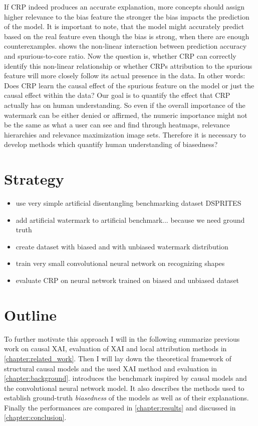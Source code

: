 If CRP indeed produces an accurate explanation, more concepts should assign higher relevance to the bias feature the stronger the bias impacts the prediction of the model. It is important to note, that the model might accurately predict based on the real feature even though the bias is strong, when there are enough counterexamples.  shows the non-linear interaction between prediction accuracy and spurious-to-core ratio.
Now the question is, whether CRP can correctly identify this non-linear relationship or whether CRPs attribution to the spurious feature will more closely follow its actual presence in the data. 
In other words: Does CRP learn the causal effect of the spurious feature on the model or just the causal effect within the data? Our goal is to quantify the effect that CRP actually has on human understanding. So even if the overall importance of the watermark can be either denied or affirmed, the numeric importance might not be the same as what a user can see and find through heatmaps, relevance hierarchies and relevance maximization image sets. Therefore it is necessary to develop methods which quantify human understanding of biasedness?  

\section{Strategy}
\begin{itemize}
    \item use very simple artificial disentangling benchmarking dataset DSPRITES
    \item add artificial watermark to artificial benchmark... because we need ground truth
    \item create dataset with biased and with unbiased watermark distribution
    \item train very small convolutional neural network on recognizing shapes
    \item evaluate CRP on neural network trained on biased and unbiased dataset
\end{itemize}

\section{Outline}
To further motivate this approach I will in the following summarize previous work on causal XAI, evaluation of XAI and local attribution methods in \cref{chapter:related_work}. Then I will lay down the theoretical framework of structural causal models and the used XAI method and evaluation in \cref{chapter:background}.  introduces the benchmark inspired by causal models and the convolutional neural network model. It also describes the methods used to establish ground-truth \textit{biasedness} of the models as well as of their explanations. Finally the performances are compared in \cref{chapter:results} and discussed in \cref{chapter:conclusion}.
